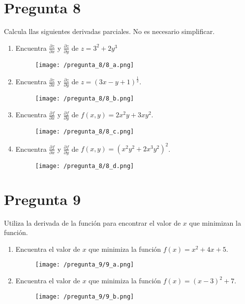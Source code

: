 \documentclass[]{article}
\begin{document}
\section*{Pregunta 8}
Calcula llas siguientes derivadas parciales. No es necesario simplificar.

\begin{enumerate}[label=(\alph*)]
	\item Encuentra $\frac{\partial z}{\partial x}$ y $\frac{\partial z}{\partial y}$ de $z=3^2+2y^3$
	\begin{figure}[H]
		\texttt{[image: /pregunta\_8/8\_a.png]}
	\end{figure}
	\item Encuentra $\frac{\partial z}{\partial x}$ y $\frac{\partial z}{\partial y}$ de $z=(3x-y+1)^\frac{1}{2}$.
	\begin{figure}[H]
		\texttt{[image: /pregunta\_8/8\_b.png]}
	\end{figure}
	\item Encuentra $\frac{\partial f}{\partial x}$ y $\frac{\partial f}{\partial y}$ de $f(x,y)=2x^2y+3xy^2$.
	\begin{figure}[H]
		\texttt{[image: /pregunta\_8/8\_c.png]}
	\end{figure}
	\item Encuentra $\frac{\partial f}{\partial x}$ y $\frac{\partial f}{\partial y}$ de $f(x,y)=(x^2y^2+2x^3y^2)^2$.
	\begin{figure}[H]
		\texttt{[image: /pregunta\_8/8\_d.png]}
	\end{figure}
\end{enumerate}

\section*{Pregunta 9}
Utiliza la derivada de la función para encontrar el valor de $x$ que minimizan la función.

\begin{enumerate}[label=(\alph*)]
	\item Encuentra el valor de $x$ que minimiza la función $f(x)=x^2+4x+5$.
	\begin{figure}[H]
		\texttt{[image: /pregunta\_9/9\_a.png]}
	\end{figure}
	\item Encuentra el valor de $x$ que minimiza la función $f(x)=(x-3)^2+7$.
	\begin{figure}[H]
		\texttt{[image: /pregunta\_9/9\_b.png]}
	\end{figure}
\end{enumerate} 
\end{document}
